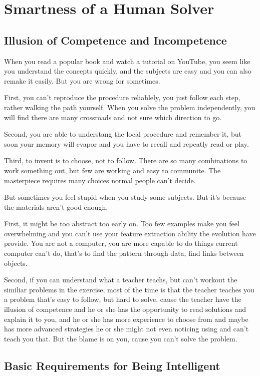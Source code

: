\section{Smartness of a Human Solver}
\subsection{Illusion of Competence and Incompetence}

When you read a popular book and watch a tutorial on YouTube, you seem like you understand the concepts quickly, and the subjects are easy and you can also remake it easily. But you are wrong for sometimes.

First, you can't reproduce the procedure reliablely, you just follow each step, rather walking the path yourself. When you solve the problem independently, you will find there are many crossroads and not sure which direction to go.

Second, you are able to understang the local procedure and remember it, but soon your memory will evapor and you have to recall and repeatly read or play.

Third, to invent is to choose, not to follow. There are so many combinations to work something out, but few are working and easy to communite. The masterpiece requires many choices normal people can't decide.

But sometimes you feel stupid when you study some subjects. But it's because the materials aren't good enough.

First, it might be too abstract too early on. Too few examples make you feel overwhelming and you can't use your feature extraction ability the evolution have provide. You are not a computer, you are more capable to do things current computer can't do, that's to find the pattern through data, find links between objects.

Second, if you can understand what a teacher teachs, but can't workout the similiar problems in the exercise, most of the time is that the teacher teaches you a problem that's easy to follow, but hard to solve, cause the teacher have the illusion of competence and he or she has the opportunity to read solutions and explain it to you, and he or she has more experience to choose from and maybe has more advanced strategies he or she might not even noticing using and can't teach you that. But the blame is on you, cause you can't solve the problem.

\subsection{Basic Requirements for Being Intelligent}

